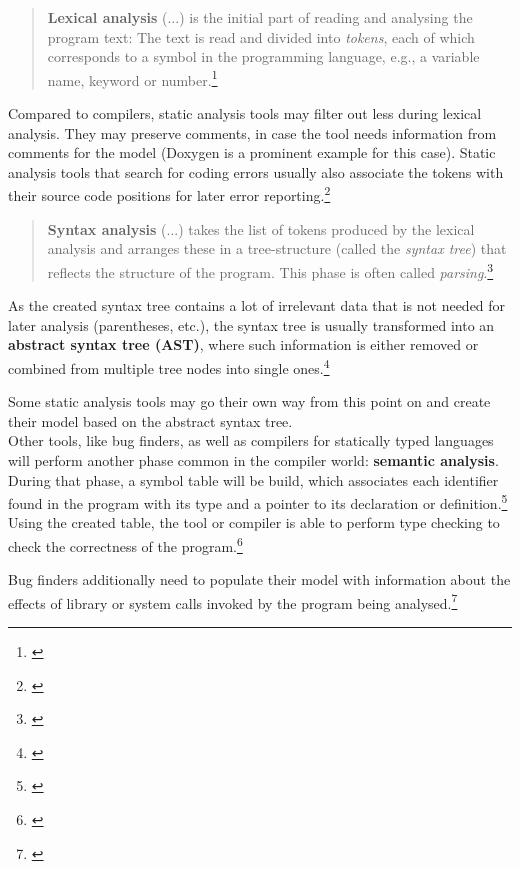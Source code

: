 \begin{quotation}
\textbf{Lexical analysis} (...) is the initial part of reading and analysing the program text: The text is read and divided into \textit{tokens}, each of which corresponds to a symbol in the programming language, e.g., a variable name, keyword or number.\footnote{\citep[2]{CompilerBasics}}
\end{quotation}

Compared to compilers, static analysis tools may filter out less during lexical analysis. They may preserve comments, in case the tool needs information from comments for the model (Doxygen is a prominent example for this case).
Static analysis tools that search for coding errors usually also associate the tokens with their source code positions for later error reporting.\footnote{\citep[72]{SecureProgramming}} 

\begin{quotation}
\textbf{Syntax analysis} (...) takes the list of tokens produced by the lexical analysis and arranges these in a tree-structure (called the \textit{syntax tree}) that reflects the structure of the program. This phase is often called \textit{parsing}.\footnote{\citep[2]{CompilerBasics}}
\end{quotation}

As the created syntax tree contains a lot of irrelevant data that is not needed for later analysis (parentheses, etc.), the syntax tree is usually transformed into an \textbf{abstract syntax tree (AST)}, where such information is either removed or combined from multiple tree nodes into single ones.\footnote{\citep[99]{CompilerBasics}}

Some static analysis tools may go their own way from this point on and create their model based on the abstract syntax tree.\\Other tools, like bug finders, as well as compilers for statically typed languages will perform another phase common in the compiler world: \textbf{semantic analysis}. During that phase, a symbol table will be build, which associates each identifier found in the program with its type and a pointer to its declaration or definition.\footnote{\citep[76]{SecureProgramming}} Using the created table, the tool or compiler is able to perform type checking to check the correctness of the program.\footnote{\citep[76]{SecureProgramming}}

Bug finders additionally need to populate their model with information about the effects of library or system calls invoked by the program being analysed.\footnote{\citep[37]{SecureProgramming}}

